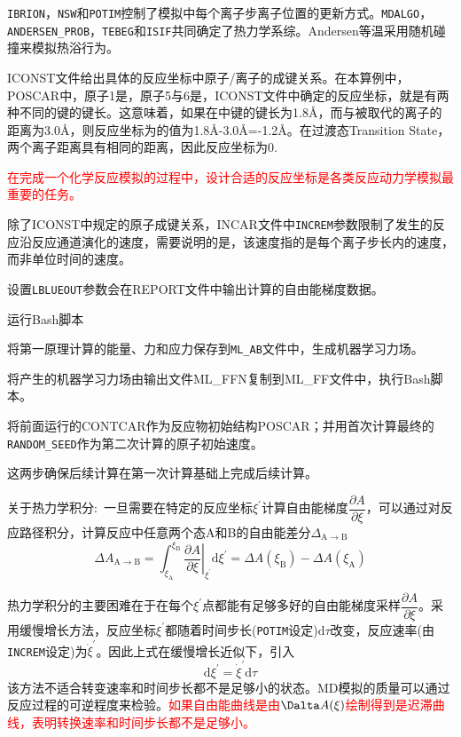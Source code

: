 \texttt{IBRION}，\texttt{NSW}和\texttt{POTIM}控制了模拟中每个离子步离子位置的更新方式。\texttt{MDALGO}，\texttt{ANDERSEN\_PROB}，\texttt{TEBEG}和\texttt{ISIF}共同确定了热力学系综。\textrm{Andersen}等温采用随机碰撞来模拟热浴行为。

\textrm{ICONST}文件给出具体的反应坐标中原子/离子的成键关系。在本算例中，\textrm{POSCAR}中，原子1是，原子5与6是，\textrm{ICONST}文件中确定的反应坐标，就是有两种不同的键的键长。这意味着，如果在中键的键长为\textrm{1.8\AA}，而与被取代的离子的距离为\textrm{3.0\AA}，则反应坐标为的值为\textrm{1.8\AA-3.0\AA=-1.2\AA}。在过渡态\textrm{Transition State}，两个离子距离具有相同的距离，因此反应坐标为0.

\textcolor{red}{在完成一个化学反应模拟的过程中，设计合适的反应坐标是各类反应动力学模拟最重要的任务。}

除了\textrm{ICONST}中规定的原子成键关系，\textrm{INCAR}文件中\texttt{INCREM}参数限制了发生的反应沿反应通道演化的速度，需要说明的是，该速度指的是每个离子步长内的速度，而非单位时间的速度。

设置\texttt{LBLUEOUT}参数会在\textrm{REPORT}文件中输出计算的自由能梯度数据。

运行\textrm{Bash}脚本

将第一原理计算的能量、力和应力保存到\texttt{ML\_AB}文件中，生成机器学习力场。

将产生的机器学习力场由输出文件\textrm{ML\_FFN}复制到\textrm{ML\_FF}文件中，执行\textrm{Bash}脚本。

将前面运行的\textrm{CONTCAR}作为反应物初始结构\textrm{POSCAR}；并用首次计算最终的\texttt{RANDOM\_SEED}作为第二次计算的原子初始速度。

这两步确保后续计算在第一次计算基础上完成后续计算。

关于热力学积分:~一旦需要在特定的反应坐标$\xi^{\prime}$计算自由能梯度$\dfrac{\partial A}{\partial\xi}$，可以通过对反应路径积分，计算反应中任意两个态\textrm{A}和\textrm{B}的自由能差分$\Delta_{\mathrm{A}\rightarrow\mathrm{B}}$
\begin{displaymath}
	\Delta A_{\mathrm{A}\rightarrow\mathrm{B}}=\int_{\xi_{\mathrm{A}}}^{\xi_\mathrm{B}}\left.\dfrac{\partial A}{\partial\xi}\right|_{\xi^{\prime}}\mathrm{d}\xi^{\prime}=\Delta A(\xi_{\mathrm{B}})-\Delta A(\xi_{\mathrm{A}})
\end{displaymath}

热力学积分的主要困难在于在每个$\xi^{\prime}$点都能有足够多好的自由能梯度采样$\dfrac{\partial A}{\partial\xi}$。采用缓慢增长方法，反应坐标$\xi^{\prime}$都随着时间步长(\texttt{POTIM}设定)$\mathrm{d}\tau$改变，反应速率(由\texttt{INCREM}设定)为$\dot{\xi}^{\prime}$。因此上式在缓慢增长近似下，引入
\begin{displaymath}
	\mathrm{d}\xi^{\prime}=\dot{\xi}^{\prime}\mathrm{d}\tau
\end{displaymath}
该方法不适合转变速率和时间步长都不是足够小的状态。\textrm{MD}模拟的质量可以通过反应过程的可逆程度来检验。\textcolor{red}{如果自由能曲线是由$\Dalta A(\xi)$绘制得到是迟滞曲线，表明转换速率和时间步长都不是足够小。}

